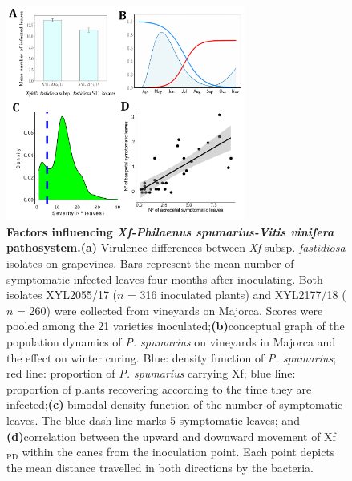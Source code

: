 \begin{figure}[H]
    \centering
    \includegraphics[width=0.7\textwidth]{Figures/Fig S1.pdf}
    \caption{\textbf{Factors influencing \textit {Xf-Philaenus
                spumarius-Vitis vinifera} pathosystem.}\textbf{(a)} Virulence
        differences
        between \textit{Xf} subsp. \textit{fastidiosa} isolates on grapevines.
        Bars
        represent the mean number of symptomatic infected leaves four months
        after
        inoculating. Both isolates XYL2055/17 ($n$ = 316 inoculated plants) and
        XYL2177/18 ($n$ = 260) were collected from vineyards on Majorca. Scores
        were
        pooled among the 21 varieties inoculated;\textbf{(b)}conceptual graph
        of the
        population dynamics of \textit{P. spumarius} on vineyards in Majorca
        and the
        effect on winter curing. Blue: density function of \textit{P.
            spumarius}; red
        line: proportion of \textit{P. spumarius} carrying Xf; blue line:
        proportion of
        plants recovering according to the time they are infected;\textbf{(c)}
        bimodal
        density function of the number of symptomatic leaves. The blue dash
        line marks
        5 symptomatic leaves; and \textbf{(d)}correlation between the upward
        and
        downward movement of Xf$_{\textrm{PD}}$ within the canes from the
        inoculation
        point. Each point depicts the mean distance travelled in both
        directions by the
        bacteria.
        \label{figS1}} %
\end{figure}

